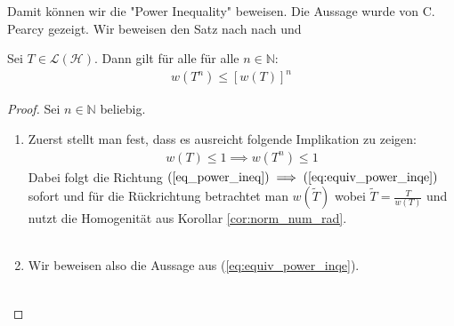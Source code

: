 Damit können wir die "Power Inequality" beweisen. Die Aussage wurde von C. Pearcy \parencite{pearcy1966elementary} gezeigt. Wir beweisen den Satz nach nach {\parencite[S. 320f (Problem 221)]{halmos2012hilbert}} und \parencite[][Theorem 2.1-1]{gustafson1997numerical}

\begin{thm}	 \label{thm:power_ineq}
	Sei $T \in \mathcal{L(H)}$. Dann gilt für alle für alle $n \in \mathbb{N}$: 
	\begin{align} \label{eq_power_ineq}
		w(T^n) \le [w(T)]^n 
	\end{align}
\end{thm}
\begin{proof}
	Sei $n\in \mathbb{N}$ beliebig.	
	
	\begin{enumerate}[label=\protect\circled{\arabic{*}}]
		\item Zuerst stellt man fest, dass es ausreicht folgende Implikation zu zeigen: 
		\begin{align}
			w(T) \le 1 \implies w(T^n) \le 1 \label{eq:equiv_power_inqe}
		\end{align}
		Dabei folgt die Richtung $(\ref{eq_power_ineq}) \implies (\ref{eq:equiv_power_inqe})$ sofort und für die Rückrichtung betrachtet man $w(\tilde{T})$ wobei $\tilde{T}=\frac{T}{w(T)}$ und nutzt die Homogenität aus Korollar \ref{cor:norm_num_rad}.\\\\
		\item Wir beweisen also die Aussage aus (\ref{eq:equiv_power_inqe}). \\\\


\end{enumerate}
\end{proof}
